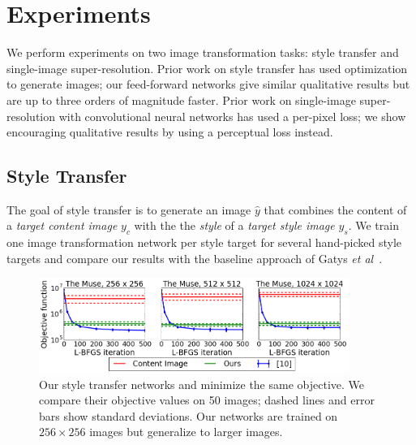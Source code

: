\documentclass[runningheads]{llncs}
\newcommand{\etal}{\textit{et al}}
\begin{document}
\section{Experiments}
We perform experiments on two image transformation tasks: style transfer and single-image
super-resolution. Prior work on style transfer has used optimization to generate images;
our feed-forward networks give similar qualitative results but are up to three orders of
magnitude faster. Prior work on single-image super-resolution with convolutional neural
networks has used a per-pixel loss; we show encouraging qualitative results by using
a perceptual loss instead.

\subsection{Style Transfer}
\label{sec:style}
The goal of style transfer is to generate an image $\hat y$ that combines the content of
a \emph{target content image} $y_c$ with the the \emph{style} of a \emph{target style image}
$y_s$. We train one image transformation network per style target for several hand-picked
style targets and compare our results with the baseline approach of
Gatys \etal~\cite{gatys2015neural}.

\begin{figure}[t]
  \centering
  \includegraphics[width=0.9\textwidth]{style_objective.png}
  \vspace{-4mm}
  \caption{Our style transfer networks and \cite{gatys2015neural} minimize the same objective.
    We compare their objective values on 50 images; dashed lines and error bars show standard
    deviations. Our networks are trained on $256\times256$ images but generalize to larger images.
  }
  \label{fig:style-loss}
  \vspace{-6mm}
\end{figure}
\end{document}

